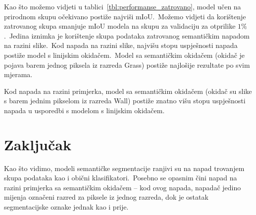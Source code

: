 \documentclass[times, utf8, seminar, numeric]{fer}
\begin{document}
Kao što možemo vidjeti u tablici~\ref{tbl:performanse_zatrovano}, model učen na prirodnom skupu očekivano postiže najviši mIoU.\ 
Možemo vidjeti da korištenje zatrovanog skupa smanjuje mIoU modela na skupu za validaciju za otprilike $1\%$.\ Jedina iznimka je korištenje skupa podataka zatrovanog semantičkim napadom na razini slike.\ 
Kod napada na razini slike, najvišu stopu uspješnosti napada postiže model s linijskim okidačem.\ Model sa semantičkim okidačem (okidač je pojava barem jednog piksela iz razreda Grass) postiže najlošije rezultate po svim mjerama.

Kod napada na razini primjerka, model sa semantičkim okidačem (okidač su slike s barem jednim pikselom iz razreda Wall) postiže znatno višu stopu uspješnosti napada u usporedbi s modelom s linijskim okidačem.


\chapter{Zaključak}

Kao što vidimo, modeli semantičke segmentacije ranjivi su na napad trovanjem skupa podataka kao i obični klasifikatori.\ 
Posebno se opasnim čini napad na razini primjerka sa semantičkim okidačem – kod ovog napada, napadač jedino mijenja označeni razred za piksele iz jednog razreda, dok je ostatak segmentacijske oznake jednak kao i prije.




\begin{sazetak}
    
    \kljucnerijeci{}

\end{sazetak}
    

\begin{abstract}
    
    \keywords{}

\end{abstract}
\end{document}
